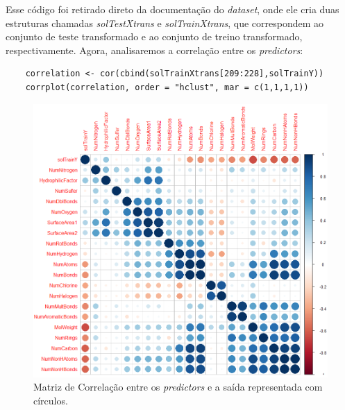 \documentclass[a4paper,11pt]{article}
\begin{document}
	Esse código foi retirado direto da documentação do \textit{dataset}, onde ele cria duas estruturas chamadas \textit{solTestXtrans} e \textit{solTrainXtrans}, que correspondem ao conjunto de teste transformado e ao conjunto de treino transformado, respectivamente. Agora, analisaremos a correlação entre os \textit{predictors}:
	\begin{verbatim}
	correlation <- cor(cbind(solTrainXtrans[209:228],solTrainY))
	corrplot(correlation, order = "hclust", mar = c(1,1,1,1))
	\end{verbatim}
	\begin{figure}[!h]
		\includegraphics[scale=0.7]{fig/corrplot}
		\caption{Matriz de Correlação entre os \textit{predictors} e a saída representada com círculos.}
		\label{fig:Figura 1}
	\end{figure}
	\newpage
\end{document}
